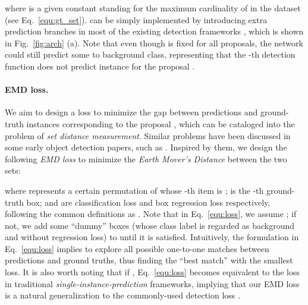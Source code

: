 \documentclass[10pt,twocolumn,letterpaper]{article}
\begin{document}
where  is a given constant standing for the maximum cardinality of  in the dataset (see Eq.~\ref{equ:gt_set}).  can be simply implemented by introducing extra prediction branches in most of the existing detection frameworks \cite{ren2015faster,lin2017feature,lin2017focal,he2017mask,liu2016ssd}, which is shown in Fig.~\ref{fig:arch} (a). Note that even though  is fixed for all proposals, the network could still predict some  to background class, representing that the -th detection function does not predict instance for the proposal .

\paragraph{EMD loss. }
We aim to design a loss  to minimize the gap between predictions  and ground-truth instances  corresponding to the proposal , which can be cataloged into the problem of \emph{set distance measurement}. Similar problems have been discussed in some early object detection papers, such as \cite{szegedy2014scalable,erhan2014scalable,stewart2016end}. Inspired by them, we design the following \emph{EMD loss} to minimize the \emph{Earth Mover's Distance} between the two sets:

where  represents a certain permutation of  whose -th item is ;  is the -th ground-truth box;  and  are classification loss and box regression loss respectively, following the common definitions as \cite{ren2015faster,liu2016ssd,lin2017feature,lin2017focal,he2017mask}. Note that in Eq.~\ref{equ:loss}, we assume ; if not, we add some ``dummy'' boxes (whose class label is regarded as background and without regression loss) to  until it is satisfied. Intuitively, the formulation in Eq.~\ref{equ:loss} implies to explore all possible one-to-one matches between predictions and ground truths, thus finding the ``best match'' with the smallest loss. It is also worth noting that if , Eq.~\ref{equ:loss} becomes equivalent to the loss in traditional \emph{single-instance-prediction} frameworks, implying that our EMD loss is a natural generalization to the commonly-used detection loss \cite{ren2015faster,liu2016ssd,lin2017feature,he2017mask}. 
\end{document}
